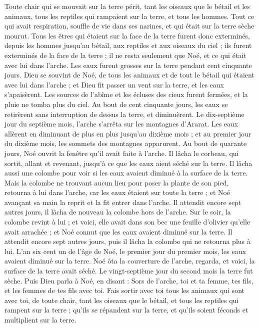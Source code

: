 \begin{multicols}{2}
Toute chair qui se mouvait sur la terre périt, tant les oiseaux que le bétail et les animaux, tous les reptiles qui rampaient sur la terre, et tous les hommes.
Tout ce qui avait respiration, souffle de vie dans ses narines, et qui était sur la terre sèche mourut.
Tous les êtres qui étaient sur la face de la terre furent donc exterminés, depuis les hommes jusqu’au bétail, aux reptiles et aux oiseaux du ciel ; ils furent exterminés de la face de la terre ; il ne resta seulement que Noé, et ce qui était avec lui dans l'arche.
Les eaux furent grosses sur la terre pendant cent cinquante jours.
\VerseOne{}Dieu se souvint de Noé, de tous les animaux et de tout le bétail qui étaient avec lui dans l'arche ; et Dieu fit passer un vent sur la terre, et les eaux s’apaisèrent.
Les sources de l'abîme et les écluses des cieux furent fermées, et la pluie ne tomba plus du ciel.
Au bout de cent cinquante jours, les eaux se retirèrent sans interruption de dessus la terre, et diminuèrent.
Le dix-septième jour du septième mois, l'arche s'arrêta sur les montagnes d'Ararat.
Les eaux allèrent en diminuant de plus en plus jusqu'au dixième mois ; et au premier jour du dixième mois, les sommets des montagnes apparurent.
Au bout de quarante jours, Noé ouvrit la fenêtre qu’il avait faite à l'arche.
Il lâcha le corbeau, qui sortit, allant et revenant, jusqu'à ce que les eaux aient séché sur la terre.
Il lâcha aussi une colombe pour voir si les eaux avaient diminué à la surface de la terre.
Mais la colombe ne trouvant aucun lieu pour poser la plante de son pied, retourna à lui dans l'arche, car les eaux étaient sur toute la terre ; et Noé avançant sa main la reprit et la fit entrer dans l'arche.
Il attendit encore sept autres jours, il lâcha de nouveau la colombe hors de l'arche.
Sur le soir, la colombe revint à lui ; et voici, elle avait dans son bec une feuille d'olivier qu'elle avait arrachée ; et Noé connut que les eaux avaient diminué sur la terre.
Il attendit encore sept autres jours, puis il lâcha la colombe qui ne retourna plus à lui.
L’an six cent un de l'âge de Noé, le premier jour du premier mois, les eaux avaient diminué sur la terre. Noé ôta la couverture de l'arche, regarda, et voici, la surface de la terre avait séché.
Le vingt-septième jour du second mois la terre fut sèche.
Puis Dieu parla à Noé, en disant :
Sors de l'arche, toi et ta femme, tes fils, et les femmes de tes fils avec toi.
Fais sortir avec toi tous les animaux qui sont avec toi, de toute chair, tant les oiseaux que le bétail, et tous les reptiles qui rampent sur la terre ; qu'ils se répandent sur la terre, et qu'ils soient féconds et multiplient sur la terre.

\end{multicols}
